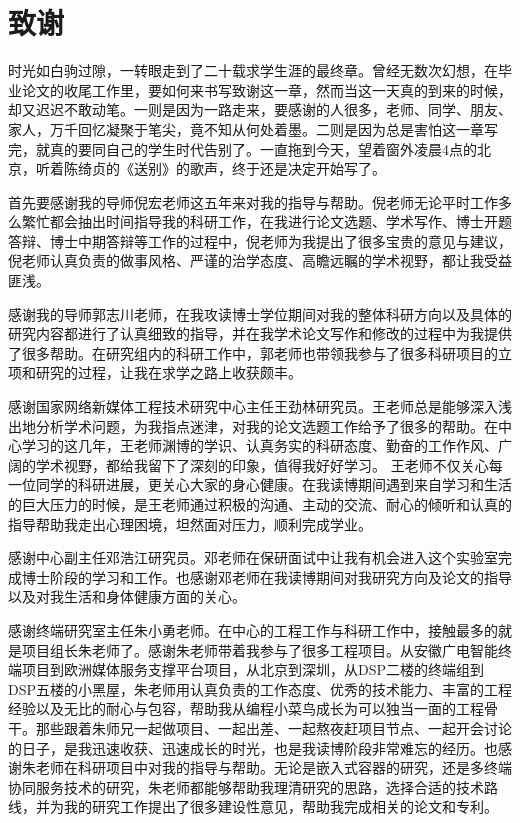 \chapter[致谢]{致\quad 谢}%

时光如白驹过隙，一转眼走到了二十载求学生涯的最终章。曾经无数次幻想，在毕业论文的收尾工作里，要如何来书写致谢这一章，然而当这一天真的到来的时候，却又迟迟不敢动笔。一则是因为一路走来，要感谢的人很多，老师、同学、朋友、家人，万千回忆凝聚于笔尖，竟不知从何处着墨。二则是因为总是害怕这一章写完，就真的要同自己的学生时代告别了。一直拖到今天，望着窗外凌晨4点的北京，听着陈绮贞的《送别》的歌声，终于还是决定开始写了。

首先要感谢我的导师倪宏老师这五年来对我的指导与帮助。倪老师无论平时工作多么繁忙都会抽出时间指导我的科研工作，在我进行论文选题、学术写作、博士开题答辩、博士中期答辩等工作的过程中，倪老师为我提出了很多宝贵的意见与建议，倪老师认真负责的做事风格、严谨的治学态度、高瞻远瞩的学术视野，都让我受益匪浅。

感谢我的导师郭志川老师，在我攻读博士学位期间对我的整体科研方向以及具体的研究内容都进行了认真细致的指导，并在我学术论文写作和修改的过程中为我提供了很多帮助。在研究组内的科研工作中，郭老师也带领我参与了很多科研项目的立项和研究的过程，让我在求学之路上收获颇丰。

感谢国家网络新媒体工程技术研究中心主任王劲林研究员。王老师总是能够深入浅出地分析学术问题，为我指点迷津，对我的论文选题工作给予了很多的帮助。在中心学习的这几年，王老师渊博的学识、认真务实的科研态度、勤奋的工作作风、广阔的学术视野，都给我留下了深刻的印象，值得我好好学习。
王老师不仅关心每一位同学的科研进展，更关心大家的身心健康。在我读博期间遇到来自学习和生活的巨大压力的时候，是王老师通过积极的沟通、主动的交流、耐心的倾听和认真的指导帮助我走出心理困境，坦然面对压力，顺利完成学业。

感谢中心副主任邓浩江研究员。邓老师在保研面试中让我有机会进入这个实验室完成博士阶段的学习和工作。也感谢邓老师在我读博期间对我研究方向及论文的指导以及对我生活和身体健康方面的关心。

感谢终端研究室主任朱小勇老师。在中心的工程工作与科研工作中，接触最多的就是项目组长朱老师了。感谢朱老师带着我参与了很多工程项目。从安徽广电智能终端项目到欧洲媒体服务支撑平台项目，从北京到深圳，从DSP二楼的终端组到DSP五楼的小黑屋，朱老师用认真负责的工作态度、优秀的技术能力、丰富的工程经验以及无比的耐心与包容，帮助我从编程小菜鸟成长为可以独当一面的工程骨干。那些跟着朱师兄一起做项目、一起出差、一起熬夜赶项目节点、一起开会讨论的日子，是我迅速收获、迅速成长的时光，也是我读博阶段非常难忘的经历。也感谢朱老师在科研项目中对我的指导与帮助。无论是嵌入式容器的研究，还是多终端协同服务技术的研究，朱老师都能够帮助我理清研究的思路，选择合适的技术路线，并为我的研究工作提出了很多建设性意见，帮助我完成相关的论文和专利。

